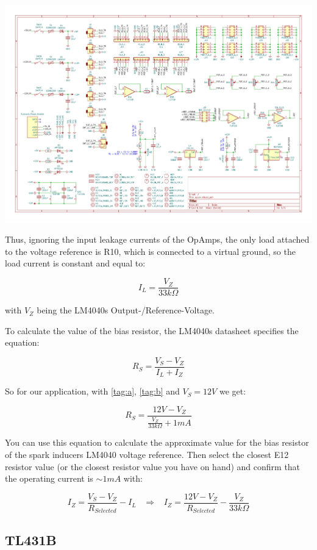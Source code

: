 \documentclass[12pt, a4paper]{article}
\begin{document}
\includegraphics[width=\textwidth, trim = 16.7cm 8.9cm 1.5cm 9.1cm, clip=true]{pdf/schematic.pdf}

Thus, ignoring the input leakage currents of the OpAmps, the only load attached to the voltage
reference is R10, which is connected to a virtual ground, so the load current is constant and
equal to:

\[ I_L = \frac{V_Z}{33k\Omega} \tag*{$(b)$}\label{tag:b} \]

with $V_Z$ being the LM4040s Output-/Reference-Voltage.

To calculate the value of the bias resistor, the LM4040s datasheet specifies the equation:

\[ R_S = \frac{V_S - V_Z}{I_L + I_Z} \tag*{$(1)$} \]

So for our application, with \ref{tag:a}, \ref{tag:b} and $V_S = 12V$ we get:

\[ R_S = \frac{12V - V_Z}{\frac{V_Z}{33k \Omega} + 1mA} \tag*{$(2)$} \]

You can use this equation to calculate the approximate value for the bias resistor of the
spark inducers LM4040 voltage reference. Then select the closest E12 resistor value
(or the closest resistor value you have on hand) and confirm that the operating current is
\enspace $\sim 1mA$ \enspace with:

\[
    I_Z = \frac{V_S - V_Z}{R_{Selected}} - I_L \;\;\; \Rightarrow \;\;\;
    I_Z = \frac{12V - V_Z}{R_{Selected}} - \frac{V_Z}{33k \Omega} \tag*{$(3)$}
\]

\subsection*{TL431B}
\end{document}
